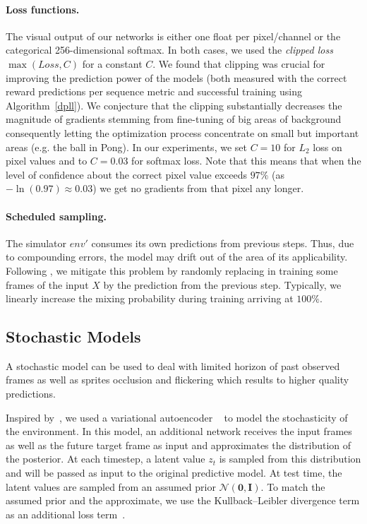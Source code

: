 \paragraph{Loss functions.}
The visual output of our networks is either one float per pixel/channel or the categorical 256-dimensional softmax. In both cases, we used the \textit{clipped loss} $\max(Loss, C)$ for a constant $C$. We found that clipping was crucial for improving the prediction power of the models (both measured with the correct reward predictions per sequence metric and successful training using Algorithm~\ref{dpll}). We conjecture that the clipping substantially decreases the magnitude of gradients stemming from fine-tuning of big areas of background consequently letting the optimization process concentrate on small but important areas (e.g. the ball in Pong). In our experiments, we set $C=10$ for $L_2$ loss on pixel values and to $C=0.03$ for softmax loss.
Note that this means that when the level of confidence about the correct pixel value exceeds $97\%$  (as $-\ln(0.97) \approx 0.03$) we get no gradients from that pixel any longer.

\paragraph{Scheduled sampling.}
The simulator $env'$ consumes its own predictions from previous steps. Thus, due to compounding errors, the model may drift out of the area of its applicability. Following \cite{BengioVJS15}, we mitigate this problem by randomly replacing in training some frames of the input $X$ by the prediction from the previous step. Typically, we linearly increase the mixing probability during training arriving at $100\%$.

\subsection{Stochastic Models}
A stochastic model can be used to deal with limited horizon of past observed frames as well as sprites occlusion and flickering which results to higher quality predictions. 


Inspired by~\citet{sv2p}, we used a variational autoencoder ~\citep{kingma2013auto} to model the stochasticity of the environment. In this model, an additional network receives the input frames as well as the future target frame as input and approximates the distribution of the posterior. At each timestep, a latent value $z_t$ is sampled from this distribution and will be passed as input to the original predictive model. At test time, the latent values are sampled from an assumed prior 
$\mathcal{N}(\mathbf{0}, \mathbf{I})$. 
To match the assumed prior and the approximate, we use the Kullback–Leibler divergence term as an additional loss term~\citep{sv2p}.



